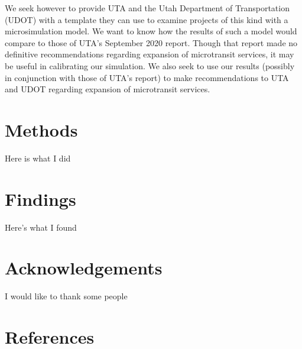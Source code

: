 \documentclass[3p, authoryear]{elsarticle} %
\begin{document}
\par

We seek however to provide UTA and the Utah Department of Transportation (UDOT) with a template they can use to examine projects of this kind with a microsimulation model. We want to know how the results of such a model would compare to those of UTA's September 2020 report. Though that report made no definitive recommendations regarding expansion of microtransit services, it may be useful in calibrating our simulation. We also seek to use our results (possibly in conjunction with those of UTA's report) to make recommendations to UTA and UDOT regarding expansion of microtransit services.

\hypertarget{methods}{%
\section{Methods}\label{methods}}

Here is what I did

\hypertarget{findings}{%
\section{Findings}\label{findings}}

Here's what I found

\hypertarget{acknowledgements}{%
\section*{Acknowledgements}\label{acknowledgements}}

I would like to thank some people

\newpage

\hypertarget{references}{%
\section*{References}\label{references}}


\end{document}
